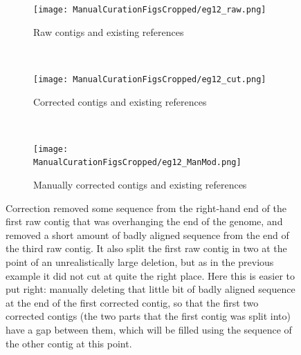 \documentclass{article}
\begin{document}
\begin{landscape}
\begin{figure}[!h]
\centering
\begin{subfigure}{1.3\textwidth}
\texttt{[image: ManualCurationFigsCropped/eg12\_raw.png]}
\caption{Raw contigs and existing references}
\end{subfigure}
\vspace*{1cm} \\
\begin{subfigure}{1.3\textwidth}
\texttt{[image: ManualCurationFigsCropped/eg12\_cut.png]}
\caption{Corrected contigs and existing references}
\end{subfigure}
\vspace*{1cm} \\
\begin{subfigure}{1.3\textwidth}
\texttt{[image: ManualCurationFigsCropped/eg12\_ManMod.png]}
\caption{Manually corrected contigs and existing references}
\end{subfigure}
\caption{
Correction removed some sequence from the right-hand end of the first raw contig that was overhanging the end of the genome, and removed a short amount of badly aligned sequence from the end of the third raw contig.
It also split the first raw contig in two at the point of an unrealistically large deletion, but as in the previous example it did not cut at quite the right place.
Here this is easier to put right: manually deleting that little bit of badly aligned sequence at the end of the first corrected contig, so that the first two corrected contigs (the two parts that the first contig was split into) have a gap between them, which will be filled using the sequence of the other contig at this point.
}
\end{figure} 

\end{landscape}
\restoregeometry




\end{document}
